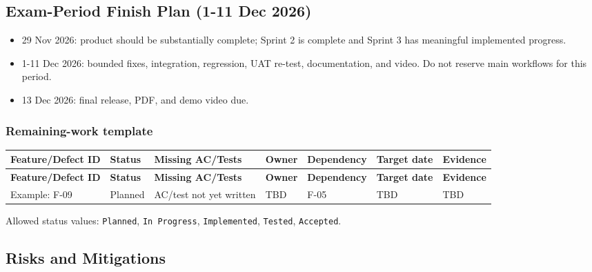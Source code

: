 \documentclass[11pt,a4paper]{article}
\begin{document}
\subsection{Exam-Period Finish Plan (1-11 Dec 2026)}

\begin{itemize}[leftmargin=*,itemsep=2pt,topsep=2pt]
  \item 29 Nov 2026: product should be substantially complete; Sprint 2 is complete and Sprint 3 has meaningful implemented progress.
  \item 1-11 Dec 2026: bounded fixes, integration, regression, UAT re-test, documentation, and video. Do not reserve main workflows for this period.
  \item 13 Dec 2026: final release, PDF, and demo video due.
\end{itemize}
\subsubsection{Remaining-work template}


\small
\vspace{0.3em}
\begin{longtable}{|>{\RaggedRight}p{2.2cm}|>{\RaggedRight}p{1.8cm}|>{\RaggedRight}p{3.5cm}|>{\RaggedRight}p{1.5cm}|>{\RaggedRight}p{1.8cm}|>{\RaggedRight}p{2.0cm}|>{\RaggedRight}p{3.0cm}|}
\hline
\rowcolor{zenPale}\textbf{Feature/Defect ID} & \textbf{Status} & \textbf{Missing AC/Tests} & \textbf{Owner} & \textbf{Dependency} & \textbf{Target date} & \textbf{Evidence} \\ \hline
\endfirsthead
\hline
\rowcolor{zenPale}\textbf{Feature/Defect ID} & \textbf{Status} & \textbf{Missing AC/Tests} & \textbf{Owner} & \textbf{Dependency} & \textbf{Target date} & \textbf{Evidence} \\ \hline
\endhead
\hline
\endfoot
Example: F-09 & Planned & AC/test not yet written & TBD & F-05 & TBD & TBD \\ \hline
\end{longtable}
\vspace{0.3em}


Allowed status values: \texttt{Planned}, \texttt{In Progress}, \texttt{Implemented}, \texttt{Tested}, \texttt{Accepted}.\\


\subsection{Risks and Mitigations}
\end{document}
